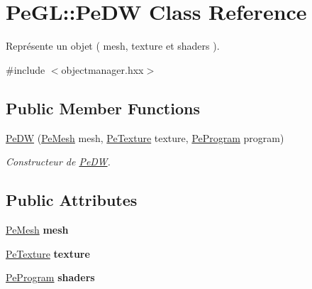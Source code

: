 \hypertarget{classPeGL_1_1PeDW}{\section{Pe\-G\-L\-:\-:Pe\-D\-W Class Reference}
\label{classPeGL_1_1PeDW}
}


Représente un objet ( mesh, texture et shaders ).  




{\ttfamily \#include $<$objectmanager.\-hxx$>$}

\subsection*{Public Member Functions}
\begin{DoxyCompactItemize}
\item 
\hyperlink{classPeGL_1_1PeDW_aada108660bf15ea3e32fe633441de6bc}{Pe\-D\-W} (\hyperlink{structPeGL_1_1PeMesh}{Pe\-Mesh} mesh, \hyperlink{classPeGL_1_1PeTexture}{Pe\-Texture} texture, \hyperlink{structPeGL_1_1PeProgram}{Pe\-Program} program)
\begin{DoxyCompactList}\small\item\em Constructeur de \hyperlink{classPeGL_1_1PeDW}{Pe\-D\-W}. \end{DoxyCompactList}\end{DoxyCompactItemize}
\subsection*{Public Attributes}
\begin{DoxyCompactItemize}
\item 
\hypertarget{classPeGL_1_1PeDW_ad3a6e5891a277fe75475a403f8470007}{\hyperlink{structPeGL_1_1PeMesh}{Pe\-Mesh} {\bfseries mesh}}\label{classPeGL_1_1PeDW_ad3a6e5891a277fe75475a403f8470007}

\item 
\hypertarget{classPeGL_1_1PeDW_a05b5ddd3f1d36b4db9c2ebd47316866d}{\hyperlink{classPeGL_1_1PeTexture}{Pe\-Texture} {\bfseries texture}}\label{classPeGL_1_1PeDW_a05b5ddd3f1d36b4db9c2ebd47316866d}

\item 
\hypertarget{classPeGL_1_1PeDW_afd3f54eb955c32dcc4e64c1a724c9f08}{\hyperlink{structPeGL_1_1PeProgram}{Pe\-Program} {\bfseries shaders}}\label{classPeGL_1_1PeDW_afd3f54eb955c32dcc4e64c1a724c9f08}

\end{DoxyCompactItemize}


